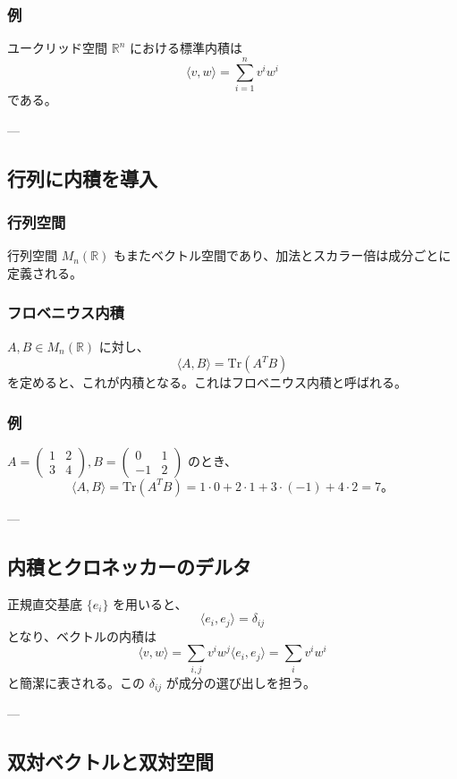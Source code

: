 \documentclass{ltjsarticle}
\begin{document}
\subsubsection{例}
ユークリッド空間 $\mathbb{R}^n$ における標準内積は
\[
\langle v,w\rangle = \sum_{i=1}^n v^i w^i
\]
である。

---

\subsection{行列に内積を導入}
\subsubsection{行列空間}
行列空間 $M_n(\mathbb{R})$ もまたベクトル空間であり、加法とスカラー倍は成分ごとに定義される。

\subsubsection{フロベニウス内積}
$A,B\in M_n(\mathbb{R})$ に対し、
\[
\langle A,B\rangle = \mathrm{Tr}(A^TB)
\]
を定めると、これが内積となる。これはフロベニウス内積と呼ばれる。

\subsubsection{例}
$A=\begin{pmatrix}1&2\\3&4\end{pmatrix}, B=\begin{pmatrix}0&1\\-1&2\end{pmatrix}$ のとき、
\[
\langle A,B\rangle = \mathrm{Tr}(A^TB)=1\cdot 0+2\cdot 1+3\cdot (-1)+4\cdot 2=7。
\]

---

\subsection{内積とクロネッカーのデルタ}
正規直交基底 $\{e_i\}$ を用いると、
\[
\langle e_i, e_j\rangle = \delta_{ij}
\]
となり、ベクトルの内積は
\[
\langle v,w\rangle = \sum_{i,j} v^i w^j \langle e_i,e_j\rangle
= \sum_i v^i w^i
\]
と簡潔に表される。この $\delta_{ij}$ が成分の選び出しを担う。

---

\subsection{双対ベクトルと双対空間}
\end{document}
